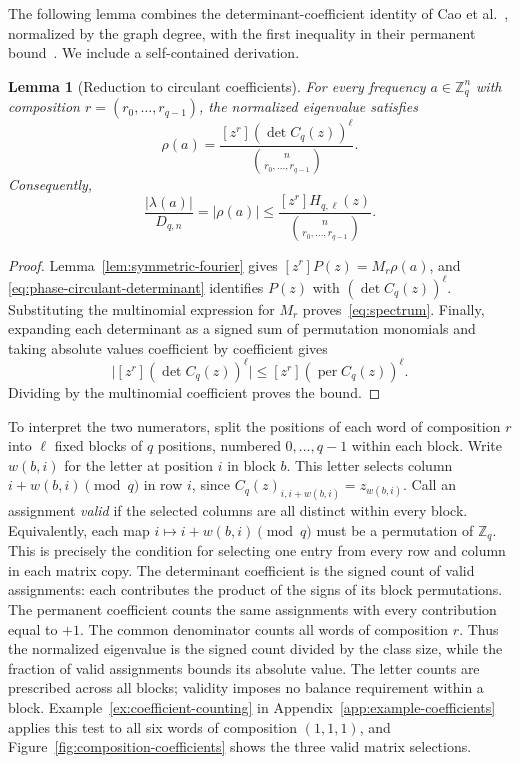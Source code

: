 \documentclass[11pt,a4paper]{article}
\numberwithin{equation}{section}
\numberwithin{figure}{section}
\numberwithin{table}{section}
\numberwithin{footnote}{section}
\newtheorem{lemma}[theorem]{Lemma}
\theoremstyle{informal}\newtheorem*{informaltheorem}{Informal theorem}
\theoremstyle{definition}\newtheorem{example}{Example}[section]
\theoremstyle{remark}\newtheorem{remark}[theorem]{Remark}
\newcommand{\Z}{\mathbb Z}
\newcommand{\per}{\operatorname{per}}
\newcommand{\mult}[2]{\binom{#1}{#2}}
\begin{document}
The following lemma combines the determinant-coefficient identity
of Cao et al.~\cite[Eq.~(2)]{cao}, normalized by the graph degree,
with the first inequality in their permanent bound~\cite[Eq.~(4)]{cao}.
We include a self-contained derivation.

\begin{lemma}[Reduction to circulant coefficients]\label{lem:coefficient-reduction}
For every frequency \(a\in\Z_q^n\) with composition
\(r=(r_0,\ldots,r_{q-1})\), the normalized eigenvalue satisfies
\begin{equation}\label{eq:spectrum}
 \rho(a)=\frac{[z^r](\det C_q(z))^\ell}
                  {\mult n{r_0,\ldots,r_{q-1}}}.
\end{equation}
Consequently,
\begin{equation}
 \frac{|\lambda(a)|}{D_{q,n}}=|\rho(a)|
 \leq\frac{[z^r]H_{q,\ell}(z)}{\mult n{r_0,\ldots,r_{q-1}}}.
\end{equation}
\end{lemma}
\begin{proof}
Lemma~\ref{lem:symmetric-fourier} gives
\([z^r]P(z)=M_r\rho(a)\), and
\eqref{eq:phase-circulant-determinant} identifies \(P(z)\) with
\((\det C_q(z))^\ell\). Substituting the multinomial expression
for \(M_r\) proves~\eqref{eq:spectrum}. Finally, expanding each determinant as a signed sum
of permutation monomials and taking absolute values coefficient by
coefficient gives
\begin{equation}
 \bigl|[z^r](\det C_q(z))^\ell\bigr|
 \leq [z^r](\per C_q(z))^\ell.
\end{equation}
Dividing by the multinomial coefficient proves the bound.
\end{proof}

To interpret the two numerators, split the positions of each word
of composition \(r\) into \(\ell\) fixed blocks of \(q\) positions, numbered
\(0,\ldots,q-1\) within each block. Write \(w(b,i)\) for the
letter at position \(i\) in block \(b\). This letter selects
column \(i+w(b,i)\pmod q\) in row \(i\), since
\(C_q(z)_{i,i+w(b,i)}=z_{w(b,i)}\). Call an assignment
\emph{valid} if the selected columns are all distinct within every
block. Equivalently, each map \(i\mapsto i+w(b,i)\pmod q\)
must be a permutation of \(\Z_q\). This is precisely the condition
for selecting one entry from every row and column in each matrix
copy. The determinant coefficient is the signed count of valid assignments:
each contributes the product of the signs of its block permutations.
The permanent coefficient counts the same assignments with every
contribution equal to \(+1\). The common denominator counts all
words of composition \(r\). Thus the normalized eigenvalue is the
signed count divided by the class size, while the fraction of valid
assignments bounds its absolute value. The letter counts are prescribed
across all blocks; validity imposes no balance requirement within a
block. Example~\ref{ex:coefficient-counting}
in Appendix~\ref{app:example-coefficients} applies this test to all
six words of composition \((1,1,1)\), and
Figure~\ref{fig:composition-coefficients} shows the three valid
matrix selections.
\end{document}

